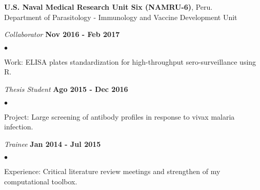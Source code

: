 \documentclass[margin,line]{res}
\newenvironment{list1}{
  \begin{list}{\ding{113}}{%
      \setlength{\itemsep}{0in}
      \setlength{\parsep}{0in} \setlength{\parskip}{0in}
      \setlength{\topsep}{0in} \setlength{\partopsep}{0in}
      \setlength{\leftmargin}{0.17in}}}{\end{list}}
\newenvironment{list2}{
  \begin{list}{$\bullet$}{%
      \setlength{\itemsep}{0in}
      \setlength{\parsep}{0in} \setlength{\parskip}{0in}
      \setlength{\topsep}{0in} \setlength{\partopsep}{0in}
      \setlength{\leftmargin}{0.2in}}}{\end{list}}
\begin{document}
\begin{resume}
{\bf U.S. Naval Medical Research Unit Six (NAMRU-6)}, Peru.\\
Department of Parasitology - Immunology and Vaccine Development Unit\\
\vspace*{-.1in}
\begin{list1}
	\item[] {\em Collaborator} \hfill {\bf Nov 2016 - Feb 2017}\\
	\vspace*{-.1in}
	\begin{list2} %
		\item Work: ELISA plates standardization for high-throughput sero-surveillance using R.\\%
	\end{list2}
	\item[] {\em Thesis Student} \hfill {\bf Ago 2015 - Dec 2016}\\
	\vspace*{-.1in}
	\begin{list2} %
		\item Project: Large screening of antibody profiles in response to vivax malaria infection.\\
	\end{list2}
	\vspace*{-.1in}
	\item[] {\em Trainee} \hfill {\bf Jan 2014 - Jul 2015}\\
	\vspace*{-.1in}
	\begin{list2} %
		\item Experience: Critical literature review meetings and strengthen of my computational toolbox.
	\end{list2}
\end{list1}


\end{resume}
\end{document}
